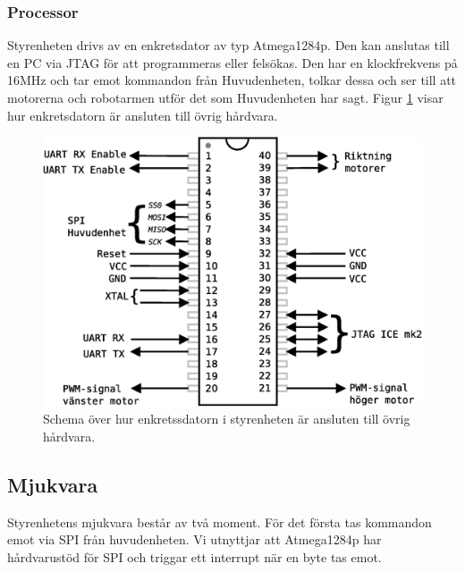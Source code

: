 \subsubsection{Processor}
Styrenheten drivs av en enkretsdator av typ Atmega1284p. Den kan anslutas till en PC via JTAG för att programmeras eller felsökas. Den har en klockfrekvens på 16MHz och tar emot kommandon från Huvudenheten, tolkar dessa och ser till att motorerna och robotarmen utför det som Huvudenheten har sagt. Figur \ref{styr-processor} visar hur enkretsdatorn är ansluten till övrig hårdvara.

\begin{figure}[h!]
	\centering
	\includegraphics[scale=0.5]{grafik/styrenhet-processor}
	\caption{Schema över hur enkretssdatorn i styrenheten är ansluten till övrig hårdvara.} \label{styr-processor}
\end{figure}

\subsection{Mjukvara}
Styrenhetens mjukvara består av två moment. För det första tas kommandon emot via SPI från huvudenheten. Vi utnyttjar att Atmega1284p har hårdvarustöd för SPI och triggar ett interrupt när en byte tas emot.

